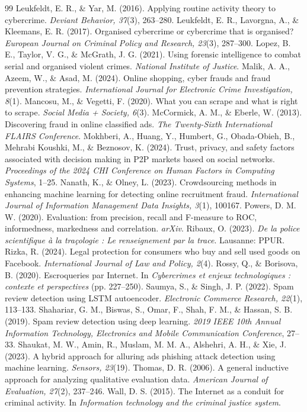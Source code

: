 \documentclass[10pt,a4paper]{article}
\begin{document}
\begin{thebibliography}{99}
 Leukfeldt, E. R., \& Yar, M. (2016). Applying routine activity theory to cybercrime. \emph{Deviant Behavior, 37}(3), 263--280.
 Leukfeldt, E. R., Lavorgna, A., \& Kleemans, E. R. (2017). Organised cybercrime or cybercrime that is organised? \emph{European Journal on Criminal Policy and Research, 23}(3), 287--300.
 Lopez, B. E., Taylor, V. G., \& McGrath, J. G. (2021). Using forensic intelligence to combat serial and organised violent crimes. \emph{National Institute of Justice}.
 Malik, A. A., Azeem, W., \& Asad, M. (2024). Online shopping, cyber frauds and fraud prevention strategies. \emph{International Journal for Electronic Crime Investigation, 8}(1).
 Mancosu, M., \& Vegetti, F. (2020). What you can scrape and what is right to scrape. \emph{Social Media + Society, 6}(3).
 McCormick, A. M., \& Eberle, W. (2013). Discovering fraud in online classified ads. \emph{The Twenty-Sixth International FLAIRS Conference}.
 Mokhberi, A., Huang, Y., Humbert, G., Obada-Obieh, B., Mehrabi Koushki, M., \& Beznosov, K. (2024). Trust, privacy, and safety factors associated with decision making in P2P markets based on social networks. \emph{Proceedings of the 2024 CHI Conference on Human Factors in Computing Systems}, 1--25.
 Nanath, K., \& Olney, L. (2023). Crowdsourcing methods in enhancing machine learning for detecting online recruitment fraud. \emph{International Journal of Information Management Data Insights, 3}(1), 100167.
 Powers, D. M. W. (2020). Evaluation: from precision, recall and F-measure to ROC, informedness, markedness and correlation. \emph{arXiv}.
 Ribaux, O. (2023). \emph{De la police scientifique à la traçologie : Le renseignement par la trace}. Lausanne: PPUR.
 Rizka, R. (2024). Legal protection for consumers who buy and sell used goods on Facebook. \emph{International Journal of Law and Policy, 2}(4).
 Rossy, Q., \& Borisova, B. (2020). Escroqueries par Internet. In \emph{Cybercrimes et enjeux technologiques : contexte et perspectives} (pp. 227--250).
 Saumya, S., \& Singh, J. P. (2022). Spam review detection using LSTM autoencoder. \emph{Electronic Commerce Research, 22}(1), 113--133.
 Shahariar, G. M., Biswas, S., Omar, F., Shah, F. M., \& Hassan, S. B. (2019). Spam review detection using deep learning. \emph{2019 IEEE 10th Annual Information Technology, Electronics and Mobile Communication Conference}, 27--33.
 Shaukat, M. W., Amin, R., Muslam, M. M. A., Alshehri, A. H., \& Xie, J. (2023). A hybrid approach for alluring ads phishing attack detection using machine learning. \emph{Sensors, 23}(19).
 Thomas, D. R. (2006). A general inductive approach for analyzing qualitative evaluation data. \emph{American Journal of Evaluation, 27}(2), 237--246.
 Wall, D. S. (2015). The Internet as a conduit for criminal activity. In \emph{Information technology and the criminal justice system}.
\end{thebibliography}
\end{document}

